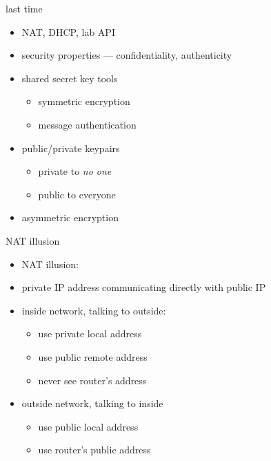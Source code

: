 \date{}
\title{}
\date{}
\usepackage{pgfplots}
\pgfplotsset{compat=1.16}

\begin{frame}
    \titlepage
\end{frame}

\begin{frame}{last time}
    \begin{itemize}
    \item NAT, DHCP, lab API
    \item security properties --- confidentiality, authenticity
    \item shared secret key tools
        \begin{itemize}
        \item symmetric encryption
        \item message authentication
        \end{itemize}
    \item public/private keypairs
        \begin{itemize}
        \item private to \textit{no one}
        \item public to everyone
        \end{itemize}
    \item asymmetric encryption
    \end{itemize}
\end{frame}


\begin{frame}{NAT illusion}
    \begin{itemize}
    \item NAT illusion:
    \item private IP address communicating directly with public IP
    \vspace{.5cm}
    \item inside network, talking to outside:
        \begin{itemize}
        \item use private local address
        \item use public remote address
        \item never see router's address
        \end{itemize}
    \item outside network, talking to inside
        \begin{itemize}
        \item use public local address
        \item use router's public address
        \end{itemize}
    \end{itemize}
\end{frame}

